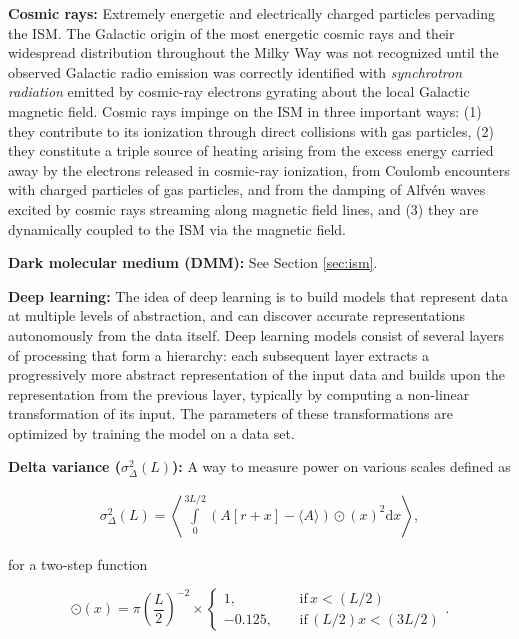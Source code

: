 \documentclass[a4paper,10pt]{article}
\begin{document}
{\noindent}\textbf{Cosmic rays:} Extremely energetic and electrically charged particles pervading the ISM. The Galactic origin of the most energetic cosmic rays and their widespread distribution throughout the Milky Way was not recognized until the observed Galactic radio emission was correctly identified with \textit{synchrotron radiation} emitted by cosmic-ray electrons gyrating about the local Galactic magnetic field. Cosmic rays impinge on the ISM in three important ways: (1) they contribute to its ionization through direct collisions with gas particles, (2) they constitute a triple source of heating arising from the excess energy carried away by the electrons released in cosmic-ray ionization, from Coulomb encounters with charged particles of gas particles, and from the damping of Alfv\'en waves excited by cosmic rays streaming along magnetic field lines, and (3) they are dynamically coupled to the ISM via the magnetic field.

{\noindent}\textbf{Dark molecular medium (DMM):} See Section \ref{sec:ism}.

{\noindent}\textbf{Deep learning:} The idea of deep learning is to build models that represent data at multiple levels of abstraction, and can discover accurate representations autonomously from the data itself. Deep learning models consist of several layers of processing that form a hierarchy: each subsequent layer extracts a progressively more abstract representation of the input data and builds upon the representation from the previous layer, typically by computing a non-linear transformation of its input. The parameters of these transformations are optimized by training the model on a data set.

{\noindent}\textbf{Delta variance ($\sigma_\Delta^2(L)$):} A way to measure power on various scales defined as

\begin{align*}
    \sigma_\Delta^2(L) = \left\langle \int\limits_0^{3L/2} {(A[r+x]-\langle A\rangle)\odot(x)}^2\mathrm{d}x \right\rangle,
\end{align*}

{\noindent}for a two-step function

\begin{equation*}
\odot(x) = \pi\left(\frac{L}{2}\right)^{-2} \times
\left\{
\begin{aligned}
1,          ~~~~~& \mathrm{if}\,x<(L/2) \\
-0.125, ~~~~~& \mathrm{if}\,(L/2)x<(3L/2)
\end{aligned}
\right.
.
\end{equation*}
\end{document}
